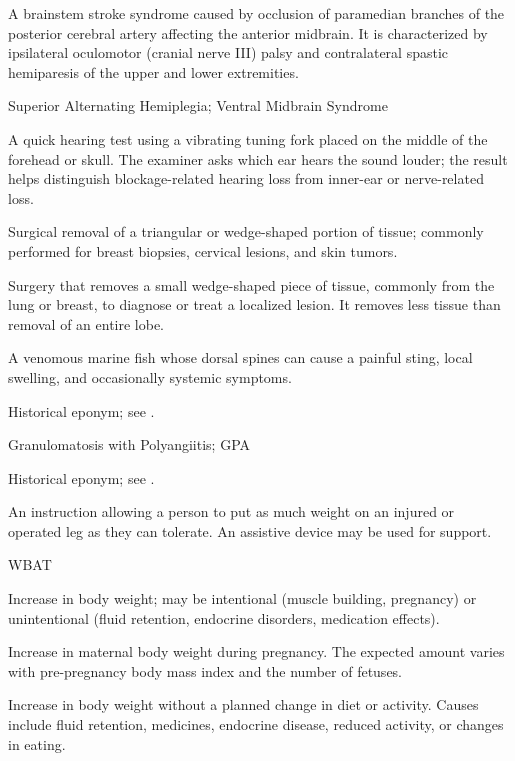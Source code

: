  A brainstem stroke syndrome caused by occlusion of paramedian branches of the posterior cerebral artery affecting the anterior midbrain. It is characterized by ipsilateral oculomotor (cranial nerve III) palsy and contralateral spastic hemiparesis of the upper and lower extremities.

\synonyms
Superior Alternating Hemiplegia; Ventral Midbrain Syndrome

 A quick hearing test using a vibrating tuning fork placed on the middle of the forehead or skull. The examiner asks which ear hears the sound louder; the result helps distinguish blockage-related hearing loss from inner-ear or nerve-related loss.

 Surgical removal of a triangular or wedge-shaped portion of tissue; commonly performed for breast biopsies, cervical lesions, and skin tumors.

 Surgery that removes a small wedge-shaped piece of tissue, commonly from the lung or breast, to diagnose or treat a localized lesion. It removes less tissue than removal of an entire lobe.

 A venomous marine fish whose dorsal spines can cause a painful sting, local swelling, and occasionally systemic symptoms.

 Historical eponym; see .

\synonyms
Granulomatosis with Polyangiitis; GPA

 Historical eponym; see .

 An instruction allowing a person to put as much weight on an injured or operated leg as they can tolerate. An assistive device may be used for support.

\synonyms
WBAT

 Increase in body weight; may be intentional (muscle building, pregnancy) or unintentional (fluid retention, endocrine disorders, medication effects).

 Increase in maternal body weight during pregnancy. The expected amount varies with pre-pregnancy body mass index and the number of fetuses.

 Increase in body weight without a planned change in diet or activity. Causes include fluid retention, medicines, endocrine disease, reduced activity, or changes in eating.

